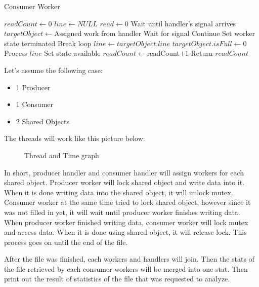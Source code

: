 \documentclass{homework}
\begin{document}
\begin{algorithm}
\caption{Consumer Worker}\label{alg:cap}
\begin{algorithmic}
\State $readCount \gets 0$
\State $line \gets NULL$
\State $read \gets 0$
\State Wait until handler's signal arrives
\State $targetObject \gets $Assigned work from handler
  
        \State Wait for signal  
        \State Continue 
\EndIf
{}  
    \State Set worker state terminated
    \State Break loop
\EndIf
\State $line \gets targetObject.line$  
\State $targetObject.isFull \gets 0$
\State Process $line$
\State Set state available
\State $readCount \gets $readCount$ + 1$
\EndWhile
\State Return $readCount$
\end{algorithmic}
\end{algorithm}

\pagebreak
Let’s assume the following case:
\begin{itemize}
    \item 1 Producer
    \item 1 Consumer
    \item 2 Shared Objects
\end{itemize}
The threads will work like this picture below:

\begin{figure}[h]
  \centering
  
  \caption{Thread and Time graph}
\end{figure}

\pagebreak
In short, producer handler and consumer handler will assign workers for each shared object. Producer worker will lock shared object and write data into it. When it is done writing data into the shared object, it will unlock mutex. Consumer worker at the same time tried to lock shared object, however since it was not filled in yet, it will wait until producer worker finishes writing data. When producer worker finished writing data, consumer worker will lock mutex and access data. When it is done using shared object, it will release lock. This process goes on until the end of the file. 
\par

After the file was finished, each workers and handlers will join. Then the stats of the file retrieved by each consumer workers will be merged into one stat. Then print out the result of statistics of the file that was requested to analyze. 
\par
\end{document}
